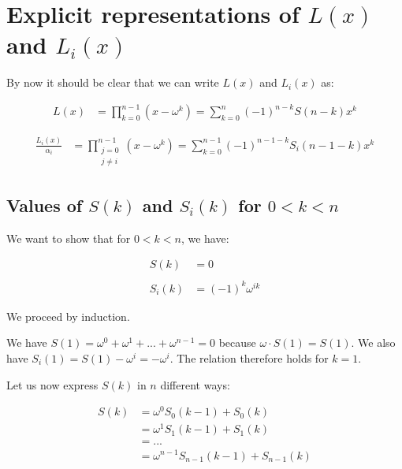 \documentclass[a4paper]{article}
\begin{document}

\section{Explicit representations of $L(x)$ and $L_i(x)$}

By now it should be clear that we can write $L(x)$ and $L_i(x)$ as:

\begin{equation}
  \begin{aligned}
    L(x) &= \prod_{k=0}^{n-1} (x - \omega^k) = \sum_{k=0}^{n} (-1)^{n-k} S(n-k) x^k
  \end{aligned}
\end{equation}

\begin{equation}
  \begin{aligned}
    \frac{L_i(x)}{\alpha_i} &= \prod_{\substack{j=0 \\ j \neq i}}^{n-1} (x - \omega^k) = \sum_{k=0}^{n-1} (-1)^{n-1-k} S_i(n-1-k) x^k
  \end{aligned}
\end{equation}

\subsection{Values of $S(k)$ and $S_i(k)$ for $0 < k < n$}

We want to show that for $0 < k < n$, we have:

\begin{equation}
  \begin{aligned}
    S(k) &= 0 \\
    \\
    S_i(k) &= (-1)^k \omega^{ik}
  \end{aligned}
\end{equation}

We proceed by induction.

We have $S(1) = \omega^0 + \omega^1 + ... + \omega^{n-1} = 0$ because $\omega \cdot S(1) = S(1)$. We also have $S_i(1) = S(1) - \omega^i = -\omega^i$. The relation therefore holds for $k = 1$.

Let us now express $S(k)$ in $n$ different ways:

\begin{equation}
  \begin{aligned}
    S(k) &= \omega^0 S_0(k-1) + S_0(k) \\
         &= \omega^1 S_1(k-1) + S_1(k) \\
         &= ... \\
         &= \omega^{n-1} S_{n-1}(k-1) + S_{n-1}(k)
  \end{aligned}
\end{equation}
\end{document}

